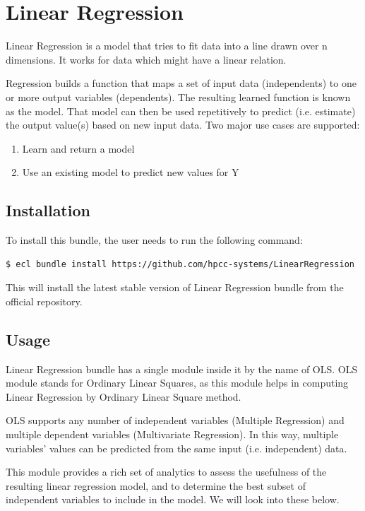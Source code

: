 \documentclass[a4paper,oneside,12pt]{book}
\begin{document}
\chapter{Linear Regression}\label{supe:linreg}

Linear Regression is a model that tries to fit data into a line drawn over n dimensions. It works for data which might have a linear relation.

Regression builds a function that maps a set of input data (independents) to one or more output variables (dependents). The resulting learned function is known as the model. That model can then be used repetitively to predict (i.e. estimate) the output value(s) based on new input data. Two major use cases are supported:

\begin{enumerate}
    \item Learn and return a model
    \item Use an existing model to predict new values for Y
\end{enumerate}

\section{Installation}

To install this bundle, the user needs to run the following command:

\begin{lstlisting}[language=bash]
    $ ecl bundle install https://github.com/hpcc-systems/LinearRegression
\end{lstlisting}

This will install the latest stable version of Linear Regression bundle from the official repository.

\section{Usage}

Linear Regression bundle has a single module inside it by the name of OLS. OLS module stands for Ordinary Linear Squares, as this module helps in computing Linear Regression by Ordinary Linear Square method.

OLS supports any number of independent variables (Multiple Regression) and multiple dependent variables (Multivariate Regression). In this way, multiple variables’ values can be predicted from the same input (i.e. independent) data.

This module provides a rich set of analytics to assess the usefulness of the resulting linear regression model, and to determine the best subset of independent variables to include in the model. We will look into these below.
\end{document}
